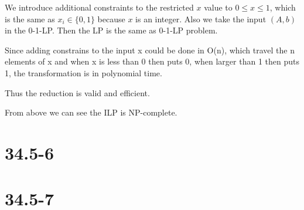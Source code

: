 \documentclass[12pt]{article}
\begin{document}
We introduce additional constraints to the restricted $x$ value to $0 \leq x \leq 1$, which is the same as $x_i \in \{0,1\}$ because $x$ is an integer. Also we take the input $(A,b)$ in the 0-1-LP. Then the LP is the same as 0-1-LP problem.

Since adding constrains to the input x could be done in O(n), which travel the n elements of x and when x is less than 0 then puts 0, when larger than 1 then puts 1, the transformation is in polynomial time.

Thus the reduction is valid and efficient.

From above we can see the ILP is NP-complete.

\section{34.5-6}

\section{34.5-7}
\end{document}
